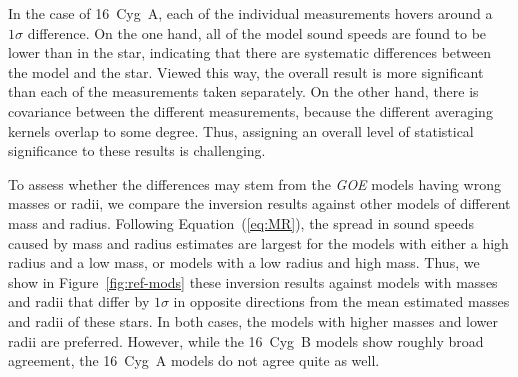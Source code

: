 In the case of 16~Cyg~A, each of the individual measurements hovers around a ${1\sigma}$ difference. 
On the one hand, all of the model sound speeds are found to be lower than in the star, indicating that there are systematic differences between the model and the star.
Viewed this way, the overall result is more significant than each of the measurements taken separately. 
On the other hand, there is covariance between the different measurements, because the different averaging kernels overlap to some degree. 
Thus, assigning an overall level of statistical significance to these results is challenging. 



To assess whether the differences may stem from the \emph{GOE} models having wrong masses or radii, we compare the inversion results against other models of different mass and radius. 
Following Equation~(\ref{eq:MR}), the spread in sound speeds caused by mass and radius estimates are largest for the models with either a high radius and a low mass, or models with a low radius and high mass. 
Thus, we show in Figure~\ref{fig:ref-mods} these inversion results against models with masses and radii that differ by ${1\sigma}$ in opposite directions from the mean estimated masses and radii of these stars. 
In both cases, the models with higher masses and lower radii are preferred. 
However, while the 16~Cyg~B models show roughly broad agreement, the 16~Cyg~A models do not agree quite as well. 

